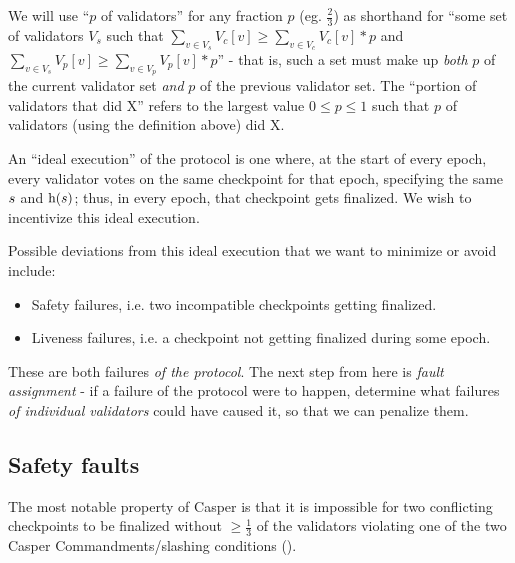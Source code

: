 \documentclass[12pt, final]{article}
\newcommand{\source}{\ensuremath{s}\space}
\newcommand{\sourceheight}{\textnormal{h(\ensuremath{s})}\space} %
\begin{document}
We will use ``$p$ of validators'' for any fraction $p$ (eg. $\frac{2}{3}$) as shorthand for ``some set of validators $V_s$ such that $\sum_{v \in V_s} V_c[v] \ge \sum_{v \in V_c} V_c[v] * p$ and $\sum_{v \in V_s} V_p[v] \ge \sum_{v \in V_p} V_p[v] * p$'' - that is, such a set must make up \textit{both} $p$ of the current validator set \textit{and} $p$ of the previous validator set. The ``portion of validators that did X'' refers to the largest value $0 \le p \le 1$ such that $p$ of validators (using the definition above) did X.

An ``ideal execution'' of the protocol is one where, at the start of every epoch, every validator votes on the same checkpoint for that epoch, specifying the same $\source$ and $\sourceheight$; thus, in every epoch, that checkpoint gets finalized. We wish to incentivize this ideal execution.

Possible deviations from this ideal execution that we want to minimize or avoid include:

\begin{itemize}
\item Safety failures, i.e. two incompatible checkpoints getting finalized.
\item Liveness failures, i.e. a checkpoint not getting finalized during some epoch.
\end{itemize}

These are both failures \textit{of the protocol}. The next step from here is \textit{fault assignment} - if a failure of the protocol were to happen, determine what failures \textit{of individual validators} could have caused it, so that we can penalize them.

\subsection{Safety faults}

The most notable property of Casper is that it is impossible for two conflicting checkpoints to be finalized without $\geq \frac{1}{3}$ of the validators violating one of the two Casper Commandments/slashing conditions ().

{}
\end{document}

